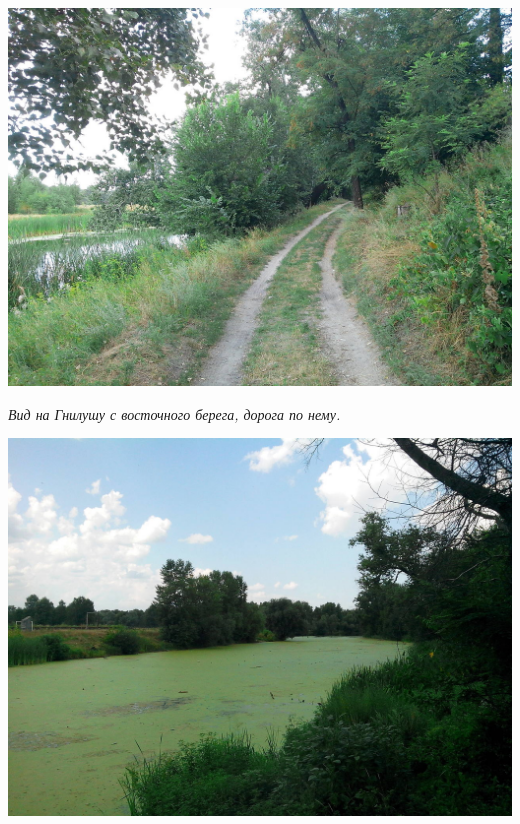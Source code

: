 \begin{center}
\includegraphics[width=\linewidth]{chast-gorodki/gnilusha/s_IMG_20140806_131746.jpg}

\textit{Вид на Гнилушу с восточного берега, дорога по нему.}
\end{center}
\vspace*{\fill}

\newpage

\begin{center}
\includegraphics[width=\linewidth]{chast-gorodki/gnilusha/s_IMG_20140806_132008.jpg}
\end{center}

